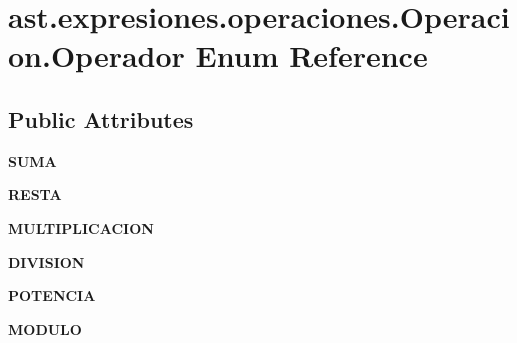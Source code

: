 \hypertarget{enumast_1_1expresiones_1_1operaciones_1_1_operacion_1_1_operador}{}\section{ast.\+expresiones.\+operaciones.\+Operacion.\+Operador Enum Reference}
\label{enumast_1_1expresiones_1_1operaciones_1_1_operacion_1_1_operador}
\subsection*{Public Attributes}
\begin{DoxyCompactItemize}
\item 
\mbox{\label{enumast_1_1expresiones_1_1operaciones_1_1_operacion_1_1_operador_a2f6c295493f152893cd6009017110a18}} 
{\bfseries S\+U\+MA}
\item 
\mbox{\label{enumast_1_1expresiones_1_1operaciones_1_1_operacion_1_1_operador_aa8fb89f748f5535fb1eec42e724c908c}} 
{\bfseries R\+E\+S\+TA}
\item 
\mbox{\label{enumast_1_1expresiones_1_1operaciones_1_1_operacion_1_1_operador_ac57dd8e6cf8358967b941a2ce9e7cfbb}} 
{\bfseries M\+U\+L\+T\+I\+P\+L\+I\+C\+A\+C\+I\+ON}
\item 
\mbox{\label{enumast_1_1expresiones_1_1operaciones_1_1_operacion_1_1_operador_a538e73edc9f70ea1839545019b5013cf}} 
{\bfseries D\+I\+V\+I\+S\+I\+ON}
\item 
\mbox{\label{enumast_1_1expresiones_1_1operaciones_1_1_operacion_1_1_operador_a82b4784bf5fb9d975b5060da1f8d707c}} 
{\bfseries P\+O\+T\+E\+N\+C\+IA}
\item 
\mbox{\label{enumast_1_1expresiones_1_1operaciones_1_1_operacion_1_1_operador_a0cd75ca7f411e1311fc7c30c7b8310f5}} 
{\bfseries M\+O\+D\+U\+LO}

\end{DoxyCompactItemize}
